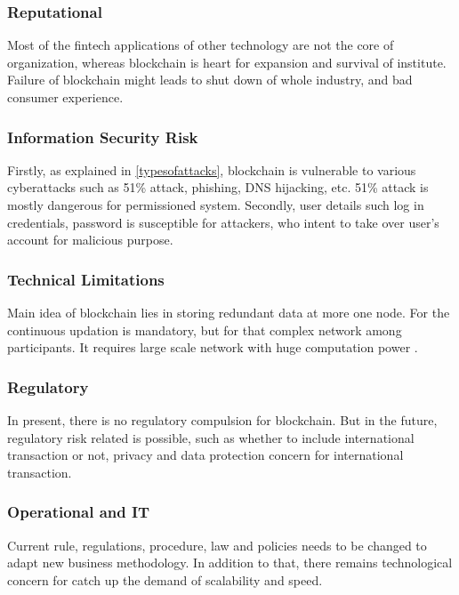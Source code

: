 \documentclass[a4paper,twoside,12pt]{report}
\begin{document}
\begin{spacing}{1.5}
\subsubsection{Reputational}
Most of the fintech applications of other technology are not the core of organization, whereas blockchain is heart for expansion and survival of institute. Failure of blockchain might leads to shut down of whole industry, and bad consumer experience.   
\subsubsection{Information Security Risk}
Firstly, as explained in \ref{typesofattacks}, blockchain is vulnerable to various cyberattacks such as 51\% attack, phishing, DNS hijacking, etc. 51\% attack is mostly dangerous for permissioned system. Secondly, user details such log in credentials, password is susceptible for attackers, who intent to take over user's account for malicious purpose. 	
\subsubsection{Technical Limitations}
Main idea of blockchain lies in storing redundant data at more one node. For the continuous updation is mandatory, but for that complex network among participants. It requires large scale network with huge computation power \cite{fangfangdai}.
\subsubsection{Regulatory}
In present, there is no regulatory compulsion for blockchain. But in the future, regulatory risk related is possible, such as whether to include international transaction or not, privacy and data protection concern for international transaction.    
\subsubsection{Operational and IT}
Current rule, regulations, procedure, law and policies needs to be changed to adapt new business methodology. In addition to that, there remains technological concern for catch up the demand of scalability and speed.   

\end{spacing}
\end{document}
